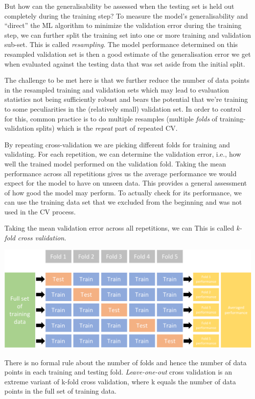 \documentclass[
]{book}
\begin{document}
But how can the generalisability be assessed when the testing set is held out completely during the training step? To measure the model's generalisability and ``direct'' the ML algorithm to minimize the validation error during the training step, we can further split the training set into one or more training and validation sub-set. This is called \emph{resampling}. The model performance determined on this resampled validation set is then a good estimate of the generalisation error we get when evaluated against the testing data that was set aside from the initial split.

The challenge to be met here is that we further reduce the number of data points in the resampled training and validation sets which may lead to evaluation statistics not being sufficiently robust and bears the potential that we're training to some peculiarities in the (relatively small) validation set. In order to control for this, common practice is to do multiple resamples (multiple \emph{folds} of training-validation splits) which is the \emph{repeat} part of repeated CV.

By repeating cross-validation we are picking different folds for training and validating. For each repetition, we can determine the validation error, i.e., how well the trained model performed on the validation fold. Taking the mean performance across all repetitions gives us the average performance we would expect for the model to have on unseen data. This provides a general assessment of how good the model may perform. To actually check for its performance, we can use the training data set that we excluded from the beginning and was not used in the CV process.

Taking the mean validation error across all repetitions, we can This is called \emph{k-fold cross validation}.

\includegraphics[width=19.88in]{fig/cv}

There is no formal rule about the number of folds and hence the number of data points in each training and testing fold. \emph{Leave-one-out} cross validation is an extreme variant of k-fold cross validation, where k equals the number of data points in the full set of training data.
\end{document}

